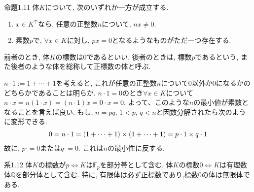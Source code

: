 \documentclass[dvipdfmx,11pt,notheorems]{beamer}
\begin{document}
\begin{frame}
  \begin{block}{命題1.11}
    体$K$について, 次のいずれか一方が成立する.
    \begin{enumerate}
      \item $x \in K^{\mp}$なら, 任意の正整数$n$について, $nx \neq 0$.
      \item 素数$p$で, $\forall x \in K$に対し, $px = 0$となるようなものがただ一つ存在する. 
    \end{enumerate}
    前者のとき, 体$K$の標数は0であるといい, 後者のときは, 標数$p$であるという, また後者のような体を総称して正標数の体と呼ぶ.
  \end{block}
  $n\cdot 1 := 1 + \cdots + 1$を考えると, これが任意の正整数$n$について0以外か0になるかのどちらかであることは明らか. $n \cdot 1 = 0$のとき$\forall x \in K$について$n \cdot x = n(1 \cdot x) = (n \cdot 1) x = 0 \cdot x = 0 $. よって、このような$n$の最小値が素数となることを言えば良い. もし, $n = pq$, $1 < p$, $q < n$と因数分解されたら次のように変形できる.
  \begin{align}
    0 = n \cdot 1 = (1 + \cdots +1) \times (1 + \cdots + 1) = p \cdot 1 \times q \cdot 1 \notag
  \end{align}
  故に, $p \cdot = 0$または$q \cdot = 0$. これは$n$の最小性に反する.
\end{frame}

\begin{frame}
  \begin{block}{系1.12}
    体$K$の標数が$p \Longleftrightarrow	 K$は$\mathbb{F}_p$を部分帯として含む. 体$K$の標数$0 \Longleftrightarrow	K$は有理数体$\mathbb{Q}$を部分体として含む. 特に, 有限体は必ず正標数であり,標数0の体は無限体である.
  \end{block}
\end{frame}
\end{document}
